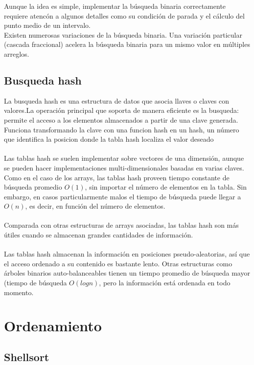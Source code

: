 \documentclass{article}
\begin{document}
Aunque la idea es simple, implementar la b\'usqueda binaria correctamente requiere
atenc\'on a algunos detalles como su condici\'on de parada y el c\'alculo del punto medio
de un intervalo. \\
Existen numerosas variaciones de la b\'usqueda binaria. Una variaci\'on particular
(cascada fraccional) acelera la b\'usqueda binaria para un mismo valor en m\'ultiples
arreglos.

\subsection*{Busqueda hash}

La busqueda hash es una estructura de datos que asocia llaves o claves con valores.La
operaci\'on principal que soporta de manera eficiente es la busqueda: permite el acceso a
 los elementos almacenados a partir de una clave generada. Funciona transformando la clave
 con una funcion hash en un hash, un n\'umero que identifica la posicion donde la tabla
hash localiza el valor deseado \\
\\
Las tablas hash se suelen implementar sobre vectores de una dimensi\'on, aunque se pueden
hacer implementaciones multi-dimensionales basadas en varias claves. Como en el caso de
los arrays, las tablas hash proveen tiempo constante de b\'usqueda promedio $O(1)$, sin
importar el n\'umero de elementos en la tabla. Sin embargo, en casos particularmente malos
el tiempo de b\'usqueda puede llegar a $O(n)$, es decir, en funci\'on del n\'umero de
elementos.\\
\\
Comparada con otras estructuras de arrays asociadas, las tablas hash son m\'as \'utiles
cuando se almacenan grandes cantidades de informaci\'on.\\
\\
Las tablas hash almacenan la informaci\'on en posiciones pseudo-aleatorias, as\'i que el acceso ordenado a su contenido es bastante lento. Otras estructuras como \'arboles binarios auto-balanceables tienen un tiempo promedio de b\'usqueda mayor (tiempo de b\'usqueda $O(log n)$, pero la informaci\'on est\'a ordenada en todo momento.\\

\section*{Ordenamiento}

\subsection*{Shellsort}
\end{document}
